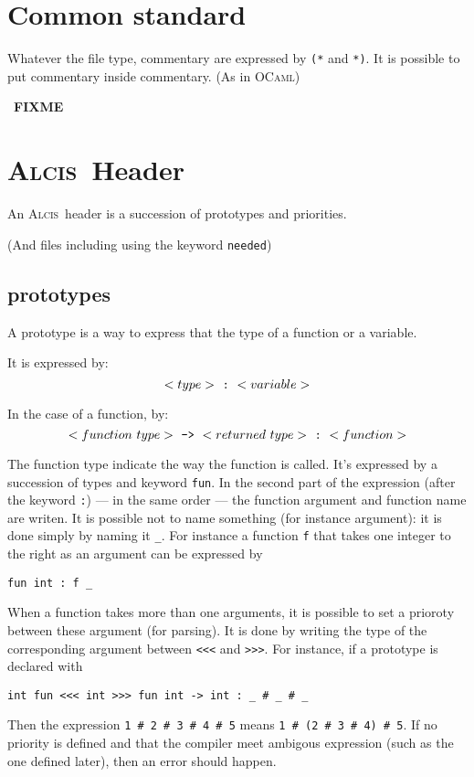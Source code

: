 \documentclass{article}
\newcommand{\Alcis}{\textsc{Alcis}~}
\newcommand{\FIXME}{~\textbf{FIXME}~}
\begin{document}
\section{Common standard}

Whatever the file type, commentary are expressed by \lstinline$(*$ and \lstinline$*)$.
It is possible to put commentary inside commentary. (As in \textsc{OCaml})

\FIXME

\section{\Alcis Header}

An \Alcis header is a succession of prototypes and priorities.

(And files including using the keyword \texttt{needed})

\subsection{prototypes}

A prototype is a way to express that the type of a function or a variable.

It is expressed by:
\[
    <type>~\textrm{\tt:}~<variable>
\]

In the case of a function, by:
\[
    <function~type>~\textrm{\tt->}~<returned~type>~\textrm{\tt:}~<function>
\]

The function type indicate the way the function is called.
It’s expressed by a succession of types and keyword \lstinline$fun$.
In the second part of the expression (after the keyword \lstinline$:$) — in the same order — the function argument and function name are writen.
It is possible not to name something (for instance argument): it is done simply by naming it \lstinline$_$.
For instance a function \lstinline$f$ that takes one integer to the right as an argument can be expressed by
\begin{lstlisting}
fun int : f _
\end{lstlisting}

When a function takes more than one arguments, it is possible to set a prioroty between these argument (for parsing).
It is done by writing the type of the corresponding argument between \lstinline$<<<$ and \lstinline$>>>$.
For instance, if a prototype is declared with
\begin{lstlisting}
int fun <<< int >>> fun int -> int : _ # _ # _
\end{lstlisting}
Then the expression \lstinline$1 # 2 # 3 # 4 # 5$ means \lstinline$1 # (2 # 3 # 4) # 5$.
If no priority is defined and that the compiler meet ambigous expression (such as the one defined later), then an error should happen.
\end{document}

